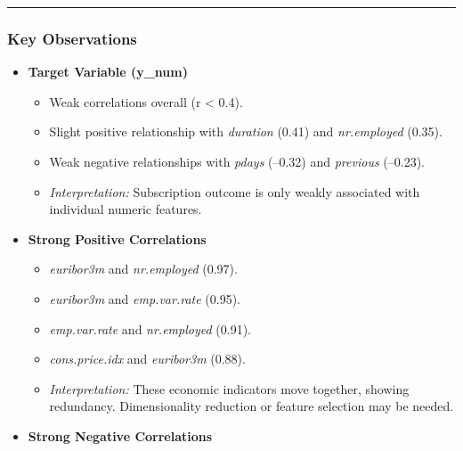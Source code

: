 \documentclass[
]{article}
\providecommand{\tightlist}{%
  \setlength{\itemsep}{0pt}\setlength{\parskip}{0pt}}
\begin{document}
\begin{center}\rule{0.5\linewidth}{0.5pt}\end{center}

\subsubsection{Key Observations}\label{key-observations}

\begin{itemize}
\tightlist
\item
  \textbf{Target Variable (y\_num)}

  \begin{itemize}
  \tightlist
  \item
    Weak correlations overall (\textbar r\textbar{} \textless{} 0.4).\\
  \item
    Slight positive relationship with \emph{duration} (0.41) and
    \emph{nr.employed} (0.35).\\
  \item
    Weak negative relationships with \emph{pdays} (--0.32) and
    \emph{previous} (--0.23).\\
  \item
    \emph{Interpretation:} Subscription outcome is only weakly
    associated with individual numeric features.
  \end{itemize}
\item
  \textbf{Strong Positive Correlations}

  \begin{itemize}
  \tightlist
  \item
    \emph{euribor3m} and \emph{nr.employed} (0.97).\\
  \item
    \emph{euribor3m} and \emph{emp.var.rate} (0.95).\\
  \item
    \emph{emp.var.rate} and \emph{nr.employed} (0.91).\\
  \item
    \emph{cons.price.idx} and \emph{euribor3m} (0.88).\\
  \item
    \emph{Interpretation:} These economic indicators move together,
    showing redundancy. Dimensionality reduction or feature selection
    may be needed.
  \end{itemize}
\item
  \textbf{Strong Negative Correlations}


\end{itemize}
\end{document}
